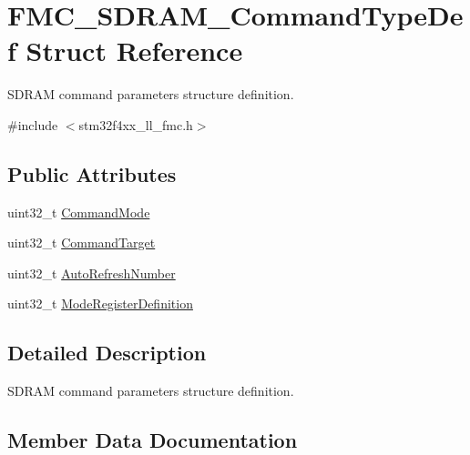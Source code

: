 \hypertarget{struct_f_m_c___s_d_r_a_m___command_type_def}{}\section{F\+M\+C\+\_\+\+S\+D\+R\+A\+M\+\_\+\+Command\+Type\+Def Struct Reference}
\label{struct_f_m_c___s_d_r_a_m___command_type_def}


S\+D\+R\+AM command parameters structure definition.  




{\ttfamily \#include $<$stm32f4xx\+\_\+ll\+\_\+fmc.\+h$>$}

\subsection*{Public Attributes}
\begin{DoxyCompactItemize}
\item 
uint32\+\_\+t \hyperlink{struct_f_m_c___s_d_r_a_m___command_type_def_acce198aed22a4a6ee69abc568393a728}{Command\+Mode}
\item 
uint32\+\_\+t \hyperlink{struct_f_m_c___s_d_r_a_m___command_type_def_a1b77fbf8ef17e12284c64f174ed736de}{Command\+Target}
\item 
uint32\+\_\+t \hyperlink{struct_f_m_c___s_d_r_a_m___command_type_def_a22efd0147d0fa1372592aae8d4c2d037}{Auto\+Refresh\+Number}
\item 
uint32\+\_\+t \hyperlink{struct_f_m_c___s_d_r_a_m___command_type_def_ab50d70f643184b7d297f7bd3569b20d7}{Mode\+Register\+Definition}
\end{DoxyCompactItemize}


\subsection{Detailed Description}
S\+D\+R\+AM command parameters structure definition. 

\subsection{Member Data Documentation}
